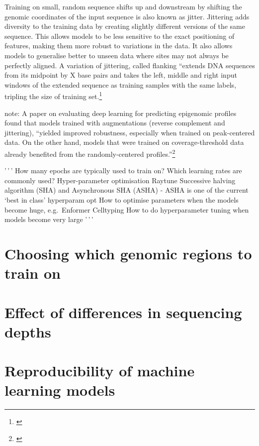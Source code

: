 \documentclass[
]{book}
\begin{document}
Training on small, random sequence shifts up and downstream by shifting the genomic coordinates of the input sequence is also known as jitter. Jittering adds diversity to the training data by creating slightly different versions of the same sequence. This allows models to be less sensitive to the exact positioning of features, making them more robust to variations in the data. It also allows models to generalise better to unseen data where sites may not always be perfectly aligned. A variation of jittering, called flanking ``extends DNA sequences from its midpoint by X base pairs and takes the left, middle and right input windows of the extended sequence as training samples with the same labels, tripling the size of training set.\footnote{\citet{cao2019}}

note:
A paper on evaluating deep learning for predicting epigenomic profiles found that models trained with augmentations (reverse complement and jittering), ``yielded improved robustness, especially when trained on peak-centered data. On the other hand, models that were trained on coverage-threshold data already benefited from the randomly-centered profiles.''\footnote{\citet{toneyan2022}}

'\,'\,'
How many epochs are typically used to train on?
Which learning rates are commonly used?
Hyper-parameter optimisation
Raytune
Successive halving algorithm (SHA) and Asynchronous SHA (ASHA) - ASHA is one of the current `best in class' hyperparam opt
How to optimise parameters when the models become huge, e.g.~Enformer Celltyping
How to do hyperparameter tuning when models become very large
'\,'\,'

\chapter{Choosing which genomic regions to train on}\label{choosing-which-genomic-regions-to-train-on}

\chapter{Effect of differences in sequencing depths}\label{effect-of-differences-in-sequencing-depths}

\chapter{Reproducibility of machine learning models}\label{reproducibility-of-machine-learning-models}
\end{document}
